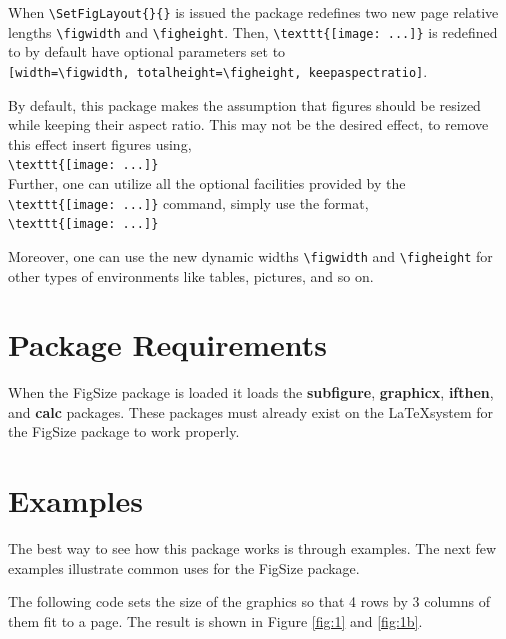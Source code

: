 \documentclass{article}
\begin{document}
When \verb"\SetFigLayout{}{}" is issued the package redefines two
new page relative lengths \verb"\figwidth" and \verb"\figheight".
Then, \verb"\texttt{[image: ...]}" is redefined to by default have
optional parameters set to \\
    \verb"[width=\figwidth, totalheight=\figheight, keepaspectratio]".

By default, this package makes the assumption that figures should
be resized while keeping their aspect ratio.  This may not be the
desired effect, to remove this effect insert figures using,\\
    \verb"\texttt{[image: ...]}"\\
\noindent Further, one can utilize all the optional facilities
provided by the \verb"\texttt{[image: ...]}" command, simply use
the format,\\
    \verb"\texttt{[image: ...]}"

Moreover, one can use the new dynamic widths \verb"\figwidth" and
\verb"\figheight" for other types of environments like tables,
pictures, and so on.

\section{Package Requirements}
When the FigSize package is loaded  it loads the
\textbf{subfigure}, \textbf{graphicx}, \textbf{ifthen}, and
\textbf{calc} packages.  These packages must already exist on the
\LaTeX system for the FigSize package to work properly.

\section{Examples}

The best way to see how this package works is through examples.
The next few examples illustrate common uses for the FigSize
package.

The following code sets the size of the graphics so that 4 rows by
3 columns of them fit to a page. The result is shown in Figure
\ref{fig:1} and \ref{fig:1b}.
\end{document}
